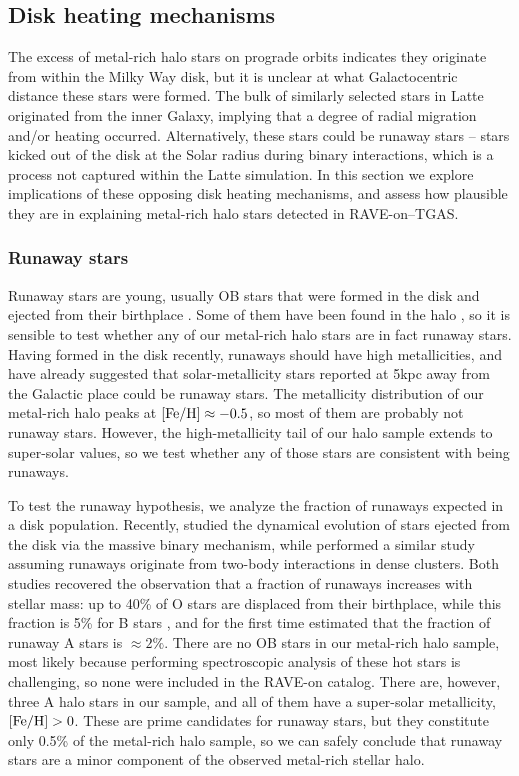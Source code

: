 \documentclass[apj, twocolappendix, numberedappendix, appendixfloats]{emulateapj}
\begin{document}
\subsection{Disk heating mechanisms}
\label{sec:diskheating}
The excess of metal-rich halo stars on prograde orbits indicates they originate from within the Milky Way disk, but it is unclear at what Galactocentric distance these stars were formed.
The bulk of similarly selected stars in Latte originated from the inner Galaxy, implying that a degree of radial migration and/or heating occurred.
Alternatively, these stars could be runaway stars -- stars kicked out of the disk at the Solar radius during binary interactions, which is a process not captured within the Latte simulation.
In this section we explore implications of these opposing disk heating mechanisms, and assess how plausible they are in explaining metal-rich halo stars detected in RAVE-on--TGAS.

\subsubsection{Runaway stars}
\label{sec:runaway}
Runaway stars are young, usually OB stars that were formed in the disk and ejected from their birthplace \citep{blaauw1961}.
Some of them have been found in the halo \citep[e.g.,][]{conlon1990}, so it is sensible to test whether any of our metal-rich halo stars are in fact runaway stars.
Having formed in the disk recently, runaways should have high metallicities, and \citet{bromley2009} have already suggested that solar-metallicity stars reported at 5\;kpc away from the Galactic place \citep{ivezic2008} could be runaway stars.
The metallicity distribution of our metal-rich halo peaks at $\rm[Fe/H]\approx-0.5$, so most of them are probably not runaway stars.
However, the high-metallicity tail of our halo sample extends to super-solar values, so we test whether any of those stars are consistent with being runaways.

To test the runaway hypothesis, we analyze the fraction of runaways expected in a disk population.
Recently, \citet{bromley2009} studied the dynamical evolution of stars ejected from the disk via the massive binary mechanism, while \citet{perets2012} performed a similar study assuming runaways originate from two-body interactions in dense clusters.
Both studies recovered the observation that a fraction of runaways increases with stellar mass: up to 40\% of O stars are displaced from their birthplace, while this fraction is 5\% for B stars \citep{blaauw1961, gies1986}, and for the first time estimated that the fraction of runaway A stars is $\approx2\%$.
There are no OB stars in our metal-rich halo sample, most likely because performing spectroscopic analysis of these hot stars is challenging, so none were included in the RAVE-on catalog.
There are, however, three A halo stars in our sample, and all of them have a super-solar metallicity, $\rm[Fe/H]>0$.
These are prime candidates for runaway stars, but they constitute only 0.5\% of the metal-rich halo sample, so we can safely conclude that runaway stars are a minor component of the observed metal-rich stellar halo.
\end{document}
